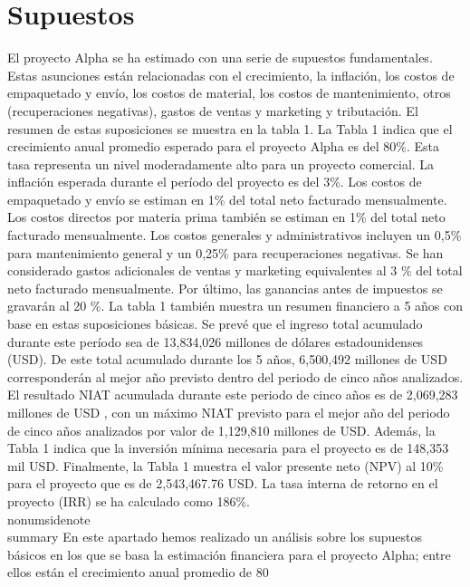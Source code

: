 \section{Supuestos}El proyecto Alpha se ha estimado con una serie de supuestos fundamentales. Estas asunciones están relacionadas con el crecimiento, la inflación, los costos de empaquetado y envío, los costos de material, los costos de mantenimiento, otros (recuperaciones negativas), gastos de ventas y marketing y tributación. El resumen de estas suposiciones se muestra en la tabla 1.
La Tabla 1 indica que el crecimiento anual promedio esperado para el proyecto Alpha es del 80\%. Esta tasa representa un nivel moderadamente alto para un proyecto comercial. La inflación esperada durante el período del proyecto es del 3\%. Los costos de empaquetado y envío se estiman en 1\% del total neto facturado mensualmente. Los costos directos por materia prima también se estiman en 1\% del total neto facturado mensualmente. Los costos generales y administrativos incluyen un 0,5\% para mantenimiento general y un 0,25\% para recuperaciones negativas. Se han considerado gastos adicionales de ventas y marketing equivalentes al 3 \% del total neto facturado mensualmente. Por último, las ganancias antes de impuestos se gravarán al 20 \%.
La tabla 1 también muestra un resumen financiero a 5 años con base en estas suposiciones básicas. Se prevé que el ingreso total acumulado durante este período sea de 13,834,026 millones de dólares estadounidenses (USD). De este total acumulado durante los 5 años, 6,500,492 millones de USD corresponderán al mejor año previsto dentro del periodo de cinco años analizados. El resultado NIAT acumulada durante este periodo de cinco años es de 2,069,283 millones de USD , con un máximo NIAT previsto para el mejor año del periodo de cinco años analizados por valor de 1,129,810 millones de USD.
Además, la Tabla 1 indica que la inversión mínima necesaria para el proyecto es de 148,353 mil USD. Finalmente, la Tabla 1 muestra el valor presente neto (NPV) al 10\% para el proyecto que es de 2,543,467.76 USD. La tasa interna de retorno en el proyecto (IRR) se ha calculado como 186\%.
\\nonumsidenote\\{summary} En este apartado hemos realizado un análisis sobre los supuestos básicos en los que se basa la estimación financiera para el proyecto Alpha; entre ellos están el crecimiento anual promedio de 80%

